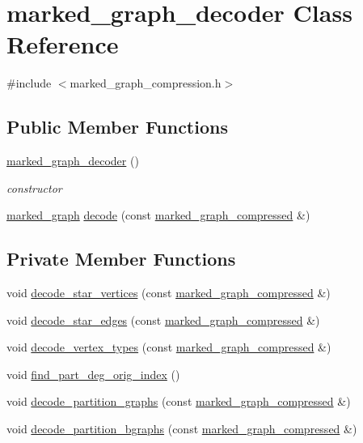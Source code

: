 \hypertarget{classmarked__graph__decoder}{}\section{marked\+\_\+graph\+\_\+decoder Class Reference}
\label{classmarked__graph__decoder}


{\ttfamily \#include $<$marked\+\_\+graph\+\_\+compression.\+h$>$}

\subsection*{Public Member Functions}
\begin{DoxyCompactItemize}
\item 
\hyperlink{classmarked__graph__decoder_ad13aa15246efd3754b3ba7d2c28300d9}{marked\+\_\+graph\+\_\+decoder} ()
\begin{DoxyCompactList}\small\item\em constructor \end{DoxyCompactList}\item 
\hyperlink{classmarked__graph}{marked\+\_\+graph} \hyperlink{classmarked__graph__decoder_a31bbd76091acf5b058fd0a7b7948f74c}{decode} (const \hyperlink{classmarked__graph__compressed}{marked\+\_\+graph\+\_\+compressed} \&)
\end{DoxyCompactItemize}
\subsection*{Private Member Functions}
\begin{DoxyCompactItemize}
\item 
void \hyperlink{classmarked__graph__decoder_a57fba34d119743414a38c7339b910d99}{decode\+\_\+star\+\_\+vertices} (const \hyperlink{classmarked__graph__compressed}{marked\+\_\+graph\+\_\+compressed} \&)
\item 
void \hyperlink{classmarked__graph__decoder_a79fcfb8d5616c691114ebc0a7adb18b2}{decode\+\_\+star\+\_\+edges} (const \hyperlink{classmarked__graph__compressed}{marked\+\_\+graph\+\_\+compressed} \&)
\item 
void \hyperlink{classmarked__graph__decoder_afc0aea714483a4dda31dd85fd20bfe5f}{decode\+\_\+vertex\+\_\+types} (const \hyperlink{classmarked__graph__compressed}{marked\+\_\+graph\+\_\+compressed} \&)
\item 
void \hyperlink{classmarked__graph__decoder_a1e035914395d2a3a50064b758c478ffd}{find\+\_\+part\+\_\+deg\+\_\+orig\+\_\+index} ()
\item 
void \hyperlink{classmarked__graph__decoder_a80eb5f68b45ba160b9a00334476b6be7}{decode\+\_\+partition\+\_\+graphs} (const \hyperlink{classmarked__graph__compressed}{marked\+\_\+graph\+\_\+compressed} \&)
\item 
void \hyperlink{classmarked__graph__decoder_aea53529191c7d56a897620b3d842ffaa}{decode\+\_\+partition\+\_\+bgraphs} (const \hyperlink{classmarked__graph__compressed}{marked\+\_\+graph\+\_\+compressed} \&)
\end{DoxyCompactItemize}
